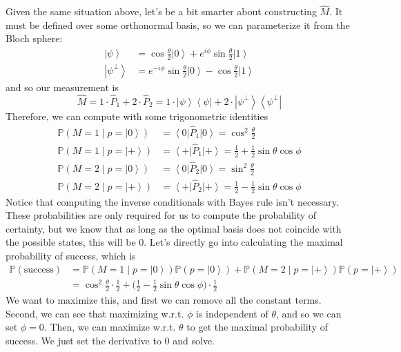\documentclass{article}
\newcommand{\ket}[1]{\ensuremath{\left|#1\right\rangle}}
\newcommand{\bra}[1]{\ensuremath{\left\langle#1\right|}}
\begin{document}
    \begin{example}
      Given the same situation above, let's be a bit smarter about constructing $\hat{M}$. It must be defined over some orthonormal basis, so we can parameterize it from the Bloch sphere: 
      \begin{align}
        \ket{\psi} & = \cos\frac{\theta}{2} \ket{0} + e^{i \phi} \sin\frac{\theta}{2} \ket{1} \\
        \ket{\psi^\perp} & = e^{-i \phi} \sin\frac{\theta}{2} \ket{0} - \cos\frac{\theta}{2} \ket{1}
      \end{align}
      and so our measurement is 
      \begin{equation}
        \hat{M} = 1 \cdot \hat{P}_1 + 2 \cdot \hat{P}_2 = 1 \cdot \ket{\psi} \bra{\psi} + 2 \cdot \ket{\psi^\perp} \bra{\psi^\perp}
      \end{equation}
      Therefore, we can compute with some trigonometric identities 
      \begin{align}
        \mathbb{P}(M = 1 \mid p = \ket{0}) & = \bra{0} \hat{P}_1 \ket{0} = \cos^2 \frac{\theta}{2} \\ 
        \mathbb{P}(M = 1 \mid p = \ket{+}) & = \bra{+} \hat{P}_1 \ket{+} = \frac{1}{2} + \frac{1}{2} \sin{\theta} \cos{\phi} \\ 
        \mathbb{P}(M = 2 \mid p = \ket{0}) & = \bra{0} \hat{P}_2 \ket{0} = \sin^2 \frac{\theta}{2} \\ 
        \mathbb{P}(M = 2 \mid p = \ket{+}) & = \bra{+} \hat{P}_2 \ket{+} = \frac{1}{2} - \frac{1}{2} \sin{\theta} \cos{\phi}
      \end{align}
      Notice that computing the inverse conditionals with Bayes rule isn't necessary. These probabilities are only required for us to compute the probability of certainty, but we know that as long as the optimal basis does not coincide with the possible states, this will be $0$. Let's directly go into calculating the maximal probability of success, which is 
      \begin{align}
        \mathbb{P}(\text{success}) & = \mathbb{P}(M = 1 \mid p = \ket{0}) \mathbb{P}(p = \ket{0}) + \mathbb{P}(M = 2 \mid p = \ket{+}) \mathbb{P}(p = \ket{+}) \\
                                   & = \cos^2 \frac{\theta}{2} \cdot \frac{1}{2} + \bigg( \frac{1}{2} - \frac{1}{2} \sin{\theta} \cos{\phi} \bigg) \cdot \frac{1}{2}
      \end{align}
      We want to maximize this, and first we can remove all the constant terms. Second, we can see that maximizing w.r.t. $\phi$ is independent of $\theta$, and so we can set $\phi = 0$. Then, we can maximize w.r.t. $\theta$ to get the maximal probability of success. We just set the derivative to $0$ and solve. 

\end{example}
\end{document}

